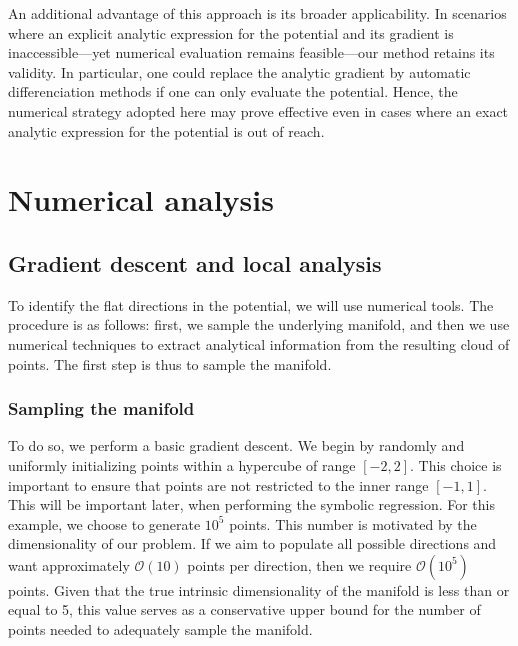 \documentclass[11pt]{article}
\newcommand{\bd}[1]{\marginpar{\parbox{\marginparwidth}{\boldmath $\Longleftarrow$}}{\boldmath\bfseries (bd: #1)}}
\begin{document}
An additional advantage of this approach is its broader applicability. In scenarios where an explicit analytic expression for the potential and its gradient is inaccessible—yet numerical evaluation remains feasible—our method retains its validity. In particular, one could replace the analytic gradient by automatic differenciation methods if one can only evaluate the potential. Hence, the numerical strategy adopted here may prove effective even in cases where an exact analytic expression for the potential is out of reach. \bd{other motivation? Example of this ? }

\section{Numerical analysis}
	\subsection{Gradient descent and local analysis}
		To identify the flat directions in the potential, we will use numerical tools. The procedure is as follows: first, we sample the underlying manifold, and then we use numerical techniques to extract analytical information from the resulting cloud of points. The first step is thus to sample the manifold.
			\subsubsection{Sampling the manifold}

		
		To do so, we perform a basic gradient descent. We begin by randomly and uniformly initializing points within a hypercube of range $[-2,2]$. This choice is important to ensure that points are not restricted to the inner range $[-1,1]$. This will be important later, when performing the symbolic regression. For this example, we choose to generate $10^5$ points. This number is motivated by the dimensionality of our problem. If we aim to populate all possible directions and want approximately $\mathcal{O}(10)$ points per direction, then we require $\mathcal{O}(10^5)$ points. Given that the true intrinsic dimensionality of the manifold is less than or equal to 5, this value serves as a conservative upper bound for the number of points needed to adequately sample the manifold.
		
\end{document}
